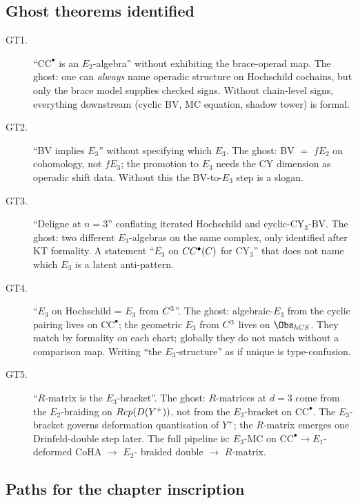 \documentclass[11pt]{article}
\theoremstyle{definition}
\theoremstyle{remark}
\newcommand{\CC}{\mathrm{CC}}
\begin{document}
\subsection*{Ghost theorems identified}

\begin{description}
\item[GT1.] ``$\CC^\bullet$ is an $E_2$-algebra'' without exhibiting
the brace-operad map. The ghost: one can \emph{always} name operadic
structure on Hochschild cochains, but only the brace model supplies
checked signs. Without chain-level signs, everything downstream
(cyclic BV, MC equation, shadow tower) is formal.

\item[GT2.] ``BV implies $E_3$'' without specifying which $E_3$.
The ghost: BV $=$ $fE_2$ on cohomology, not $fE_3$; the promotion
to $E_3$ needs the CY dimension as operadic shift data. Without this
the BV-to-$E_3$ step is a slogan.

\item[GT3.] ``Deligne at $n=3$'' conflating iterated Hochschild and
cyclic-CY$_3$-BV. The ghost: two different $E_3$-algebras on the
same complex, only identified after KT formality. A statement
``$E_3$ on $\CC^\bullet(\cC)$ for CY$_3$'' that does not name which
$E_3$ is a latent anti-pattern.

\item[GT4.] ``$E_3$ on Hochschild = $E_3$ from $C^3$''. The ghost:
algebraic-$E_3$ from the cyclic pairing lives on $\CC^\bullet$; the
geometric $E_3$ from $C^3$ lives on $\Obs_{\mathrm{hCS}}$. They
match by formality on each chart; globally they do not match
without a comparison map. Writing ``the $E_3$-structure'' as if
unique is type-confusion.

\item[GT5.] ``$R$-matrix is the $E_3$-bracket''. The ghost:
$R$-matrices at $d = 3$ come from the $E_2$-braiding on
$Rep(D(Y^+))$, not from the $E_3$-bracket on $\CC^\bullet$. The
$E_3$-bracket governs deformation quantisation of $Y^+$; the
$R$-matrix emerges one Drinfeld-double step later. The full pipeline
is: $E_3$-MC on $\CC^\bullet \to E_1$-deformed CoHA $\to$ $E_2$-
braided double $\to$ $R$-matrix.
\end{description}

\subsection*{Paths for the chapter inscription}
\end{document}
